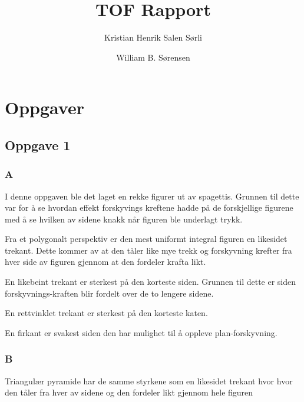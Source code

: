 \documentclass{report}
\author{
  Kristian Henrik Salen Sørli
  \and
  William B. Sørensen\\
}
\title{TOF Rapport}
\begin{document}
\maketitle

\tableofcontents

\chapter{Oppgaver}

\section{Oppgave 1}

\subsection{A}

I denne oppgaven ble det laget en rekke figurer ut av spagettis. Grunnen til dette var for å se hvordan effekt forskyvings kreftene hadde på de forskjellige figurene med å se hvilken av sidene knakk når figuren ble underlagt trykk.

Fra et polygonalt perspektiv er den mest uniformt integral figuren en likesidet trekant. Dette kommer av at den tåler like mye trekk og forskyvning krefter fra hver side av figuren gjennom at den fordeler krafta likt.

En likebeint trekant er sterkest på den korteste siden. Grunnen til dette er siden forskyvnings-kraften blir fordelt over de to lengere sidene.

En rettvinklet trekant er sterkest på den korteste katen.

En firkant er svakest siden den har mulighet til å oppleve plan-forskyvning.

\subsection{B}

Triangulær pyramide har de samme styrkene som en likesidet trekant hvor hvor den tåler fra hver av sidene og den fordeler likt gjennom hele figuren
\end{document}
